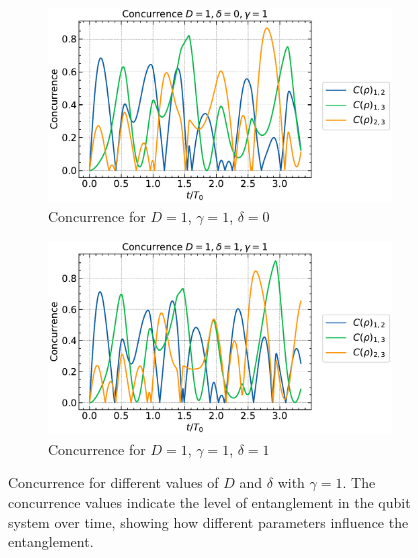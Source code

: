 \begin{figure}[h!]
    \begin{subfigure}[b]{0.48\textwidth}
        \centering
        \includegraphics[width=\linewidth]{results_and_discussion/3_qubits/up_down_with_ana_1_1_0.pdf}
        \caption{Concurrence for \( D = 1\), \( \gamma = 1\), \( \delta = 0\)}
        \label{fig:subfig3}
    \end{subfigure}
    \hfill
    \begin{subfigure}[b]{0.48\textwidth}
        \centering
        \includegraphics[width=\linewidth]{results_and_discussion/3_qubits/up_down_with_ana_1_1_1.pdf}
        \caption{Concurrence for \( D = 1\), \( \gamma = 1\), \( \delta = 1\)}
        \label{fig:subfig4}
    \end{subfigure}

    \caption{Concurrence for different values of \( D \) and \( \delta \) with \( \gamma = 1 \). The concurrence values indicate the level of entanglement in the qubit system over time, showing how different parameters influence the entanglement.}
    \label{fig:concurrence_comparison}
\end{figure}


